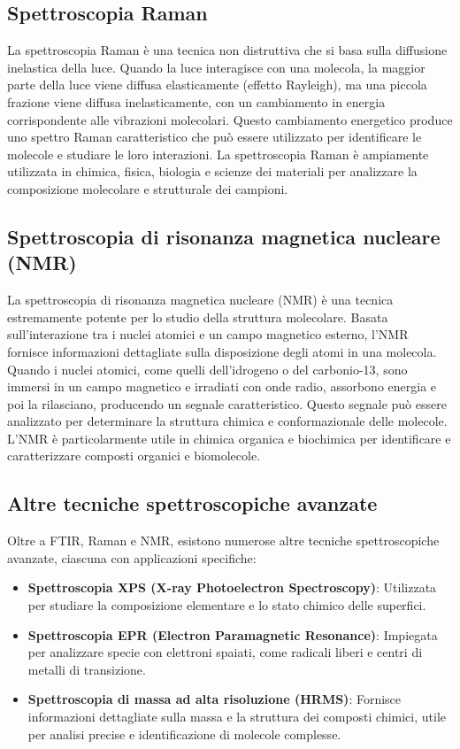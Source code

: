 \documentclass[12pt,a4paper]{report}
\begin{document}
\subsection{Spettroscopia Raman}

La spettroscopia Raman è una tecnica non distruttiva che si basa sulla diffusione inelastica della luce. Quando la luce interagisce con una molecola, la maggior parte della luce viene diffusa elasticamente (effetto Rayleigh), ma una piccola frazione viene diffusa inelasticamente, con un cambiamento in energia corrispondente alle vibrazioni molecolari. Questo cambiamento energetico produce uno spettro Raman caratteristico che può essere utilizzato per identificare le molecole e studiare le loro interazioni. La spettroscopia Raman è ampiamente utilizzata in chimica, fisica, biologia e scienze dei materiali per analizzare la composizione molecolare e strutturale dei campioni.

\subsection{Spettroscopia di risonanza magnetica nucleare (NMR)}

La spettroscopia di risonanza magnetica nucleare (NMR) è una tecnica estremamente potente per lo studio della struttura molecolare. Basata sull'interazione tra i nuclei atomici e un campo magnetico esterno, l'NMR fornisce informazioni dettagliate sulla disposizione degli atomi in una molecola. Quando i nuclei atomici, come quelli dell'idrogeno o del carbonio-13, sono immersi in un campo magnetico e irradiati con onde radio, assorbono energia e poi la rilasciano, producendo un segnale caratteristico. Questo segnale può essere analizzato per determinare la struttura chimica e conformazionale delle molecole. L'NMR è particolarmente utile in chimica organica e biochimica per identificare e caratterizzare composti organici e biomolecole.

\subsection{Altre tecniche spettroscopiche avanzate}

Oltre a FTIR, Raman e NMR, esistono numerose altre tecniche spettroscopiche avanzate, ciascuna con applicazioni specifiche:

\begin{itemize}
\item \textbf{Spettroscopia XPS (X-ray Photoelectron Spectroscopy)}: Utilizzata per studiare la composizione elementare e lo stato chimico delle superfici.
\item \textbf{Spettroscopia EPR (Electron Paramagnetic Resonance)}: Impiegata per analizzare specie con elettroni spaiati, come radicali liberi e centri di metalli di transizione.
\item \textbf{Spettroscopia di massa ad alta risoluzione (HRMS)}: Fornisce informazioni dettagliate sulla massa e la struttura dei composti chimici, utile per analisi precise e identificazione di molecole complesse.
\end{itemize}
\end{document}
